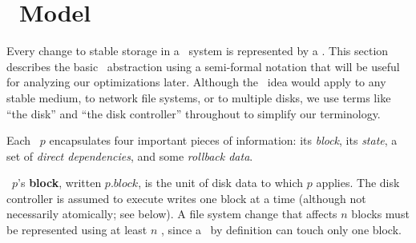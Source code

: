 
\section{\Patch\ Model}
\label{sec:patch}

\makeatletter
\let\emptyset\varnothing
\newcommand{\PState}[1]{\ensuremath{#1.\textit{state}}}
\newcommand{\PBlock}[1]{\ensuremath{#1.\textit{block}}}
\newcommand{\PMemst}{\ensuremath{\textit{mem}}}
\newcommand{\PInfst}{\ensuremath{\textit{flight}}}
\newcommand{\PDiskst}{\ensuremath{\textit{disk}}}
\newcommand{\PSetlim}[1]{\def\@next{#1}\ifx\@next\@empty\else[\@next]\fi}
\newcommand{\PMem}[1][]{\ensuremath{\textit{Mem}\PSetlim{#1}}}
\newcommand{\PInf}[1][]{\ensuremath{\textit{Flight}\PSetlim{#1}}}
\newcommand{\PDisk}[1][]{\ensuremath{\textit{Disk}\PSetlim{#1}}}
\newcommand{\PHard}[1][]{\ensuremath{\textit{\Nrb}\PSetlim{#1}}}
\newcommand{\PSoft}[1][]{\ensuremath{\textit{\Rb}\PSetlim{#1}}}
\newcommand{\PEmpty}[1][]{\ensuremath{\textit{\Noop}\PSetlim{#1}}}
\newcommand{\PDDepset}[1]{\ensuremath{\def\@next{#1}\ifx\@next\@empty\else\@next.\fi\textit{ddeps}}}
\newcommand{\PDepend}{\ensuremath{\leadsto}}
\newcommand{\PDDepend}{\ensuremath{\rightarrow}}
\newcommand{\PDepset}[1]{\ensuremath{\textit{Dep}[#1]}}
\newcommand{\PRDepset}[1]{\ensuremath{\textit{RDep}[#1]}}
\makeatother

Every change to stable storage in a \Kudos\ system is represented by a
\emph{\patch}.
%
This section describes the basic \patch\ abstraction using a semi-formal
notation that will be useful for analyzing our optimizations later.
%
Although the \patch\ idea would apply to any stable medium, to network file
systems, or to multiple disks, we use terms like ``the disk'' and ``the
disk controller'' throughout to simplify our terminology.


Each \patch\ $p$ encapsulates four important pieces of information: its
 \emph{block}, its \emph{state}, a set of \emph{direct dependencies}, and
 some \emph{rollback data}.

\Patch\ $p$'s \textbf{block}, written $\PBlock{p}$, is the unit of disk data
 to which $p$ applies.  The disk controller is assumed to execute writes one
 block at a time (although not necessarily atomically; see below).  A file system
 change that affects $n$ blocks must be represented using at least $n$
 \patches, since a \patch\ by definition can touch only one block.

